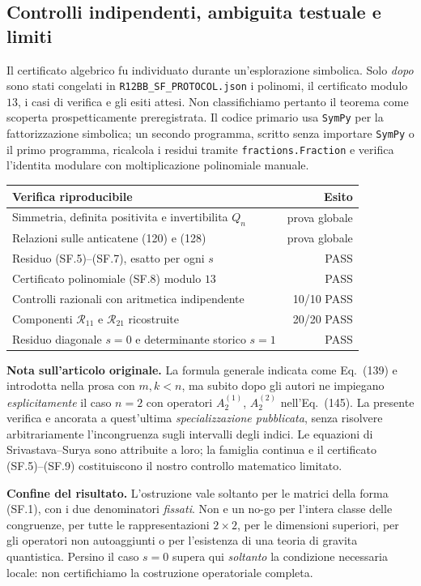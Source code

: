 \documentclass[11pt,a4paper]{article}
\begin{document}
\subsection*{Controlli indipendenti, ambiguita testuale e limiti}
Il certificato algebrico fu individuato durante un'esplorazione simbolica. Solo \emph{dopo} sono stati congelati in \texttt{R12BB\_SF\_PROTOCOL.json} i polinomi, il certificato modulo $13$, i casi di verifica e gli esiti attesi. Non classifichiamo pertanto il teorema come scoperta prospetticamente preregistrata. Il codice primario usa \texttt{SymPy} per la fattorizzazione simbolica; un secondo programma, scritto senza importare \texttt{SymPy} o il primo programma, ricalcola i residui tramite \texttt{fractions.Fraction} e verifica l'identita modulare con moltiplicazione polinomiale manuale.

\begin{center}\small
\begin{tabular}{p{9.3cm}r}
\toprule
Verifica riproducibile & Esito\\\midrule
Simmetria, definita positivita e invertibilita $Q_n$ & prova globale\\
Relazioni sulle anticatene (120) e (128) & prova globale\\
Residuo (SF.5)--(SF.7), esatto per ogni $s$ & PASS\\
Certificato polinomiale (SF.8) modulo $13$ & PASS\\
Controlli razionali con aritmetica indipendente & 10/10 PASS\\
Componenti $\mathcal R_{11}$ e $\mathcal R_{21}$ ricostruite & 20/20 PASS\\
Residuo diagonale $s=0$ e determinante storico $s=1$ & PASS\\
\bottomrule
\end{tabular}
\end{center}
\textbf{Nota sull'articolo originale.} La formula generale indicata come Eq.~(139) e introdotta nella prosa con $m,k<n$, ma subito dopo gli autori ne impiegano \emph{esplicitamente} il caso $n=2$ con operatori $A_2^{(1)}$, $A_2^{(2)}$ nell'Eq.~(145). La presente verifica e ancorata a quest'ultima \emph{specializzazione pubblicata}, senza risolvere arbitrariamente l'incongruenza sugli intervalli degli indici. Le equazioni di Srivastava--Surya sono attribuite a loro; la famiglia continua e il certificato (SF.5)--(SF.9) costituiscono il nostro controllo matematico limitato.

\textbf{Confine del risultato.} L'ostruzione vale soltanto per le matrici della forma (SF.1), con i due denominatori \emph{fissati}. Non e un no-go per l'intera classe delle congruenze, per tutte le rappresentazioni $2\times2$, per le dimensioni superiori, per gli operatori non autoaggiunti o per l'esistenza di una teoria di gravita quantistica. Persino il caso $s=0$ supera qui \emph{soltanto} la condizione necessaria locale: non certifichiamo la costruzione operatoriale completa.
\end{document}
